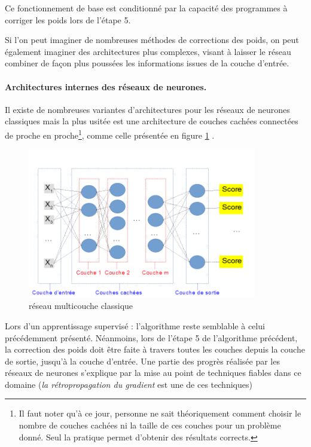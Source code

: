Ce fonctionnement de base est conditionné par la capacité des programmes
à corriger les poids lors de l'étape 5.

Si l'on peut imaginer de nombreuses méthodes de corrections des poids,
on peut également imaginer des architectures plus complexes, visant à
laisser le réseau combiner de façon plus poussées les informations
issues de la couche d'entrée.

\hypertarget{architectures-internes-des-ruxe9seaux-de-neurones.}{%
\paragraph{Architectures internes des réseaux de
neurones.}\label{architectures-internes-des-ruxe9seaux-de-neurones.}}

Il existe de nombreuses variantes d'architectures pour les réseaux de
neurones classiques mais la plus usitée est une architecture de couches
cachées connectées de proche en
proche\footnote{Il faut noter qu'à ce jour, personne ne sait théoriquement comment choisir le nombre de couches cachées ni la taille de ces couches pour un problème donné. Seul la pratique permet d'obtenir des résultats corrects.},
comme celle présentée en figure \ref{fig:multicouche} .

\begin{figure}[h!]
\label{fig:multicouche}
\centering
\includegraphics[width=10cm]{./images/multicouche.png}
\caption{réseau multicouche classique}
\end{figure}

Lors d'un apprentissage supervisé : l'algorithme reste semblable à celui
précédemment présenté. Néanmoins, lors de l'étape 5 de l'algorithme
précédent, la correction des poids doit être faite à travers toutes les
couches depuis la couche de sortie, jusqu'à la couche d'entrée. Une
partie des progrès réalisée par les réseaux de neurones s'explique par
la mise au point de techniques fiables dans ce domaine (\emph{la
rétropropagation du gradient} est une de ces techniques)

